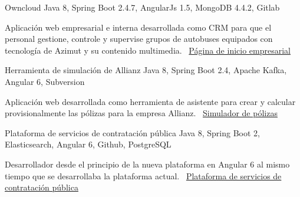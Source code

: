 \documentclass[]{awesome-cv}
\begin{document}
\begin{cventries}
	\vspace{-3mm}
	\cventry
	{}
	{Owncloud \vspace{-5mm}}
	{Java 8, Spring Boot 2.4.7, AngularJs 1.5, MongoDB 4.4.2, Gitlab \vspace{-5mm}}
	{}
	{\begin{cvsectionnormaltext}
		\item {Aplicación web empresarial e interna desarrollada como CRM para que el personal gestione, controle y supervise grupos de autobuses equipados con tecnología de Azimut y su contenido multimedia. 
		\newline \faLink\ \href{https://www.azimutelectronics.com}{Página de inicio empresarial}}
	\end{cvsectionnormaltext}}

	\vspace{-3mm}
	\cventry
	{}
	{Herramienta de simulación de Allianz \vspace{-5mm}}
	{Java 8, Spring Boot 2.4, Apache Kafka, Angular 6, Subversion \vspace{-5mm}}
	{}
	{\begin{cvsectionnormaltext}
		\item{Aplicación web desarrollada como herramienta de asistente para crear y calcular provisionalmente las pólizas para la empresa Allianz.
      \newline \faLink\ \href{https://www.allianzdirect.es/seguro-de-coche/calcular-precio/}{Simulador de pólizas}}
	\end{cvsectionnormaltext}}
	
	\vspace{-3mm}
	\cventry
	{}
	{Plataforma de servicios de contratación pública \vspace{-5mm}}
	{Java 8, Spring Boot 2, Elasticsearch, Angular 6, Github, PostgreSQL \vspace{-5mm}}
	{}
	{\begin{cvsectionnormaltext}
		\item{Desarrollador desde el principio de la nueva plataforma en Angular 6 al mismo tiempo que se desarrollaba la plataforma actual.
		\newline \faLink\ \href{https://contractaciopublica.cat/ca/inici}{Plataforma de servicios de contratación pública}}
	\end{cvsectionnormaltext}}
	\vspace{-5mm}
\end{cventries}
\end{document}
